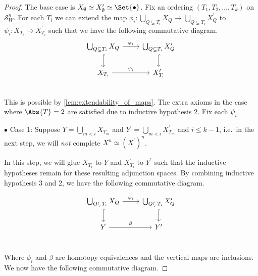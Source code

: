 \documentclass[class=article, crop=false]{standalone}
\begin{document}
\begin{proof}
    The base case is $X_\emptyset \simeq X^\prime_\emptyset \simeq \Set{\bullet}$.
    Fix an ordering $(T_1, T_2, \ldots , T_k)$ on $\mathcal{S}^n_W$.
    For each $T_i$ we can extend the map $\phi_i \colon \bigcup_{Q \subsetneq T_i} X_{Q} \to \bigcup_{Q \subsetneq T_i} X^\prime_{Q}$ to $\psi_i \colon X_{T_i} \to X^\prime_{T_i}$ such that we have the following commutative diagram.
    \vspace{0.2cm}
    \begin{equation*}
        \begin{tikzcd}
\bigcup_{Q \subsetneq T_i} X_{Q}  \ar[r, "\phi_i"]             &   \bigcup_{Q \subsetneq T_i} X^\prime_{Q}                                  \\
X_{T_i} \ar[r, "\psi_i" ] \ar[from = u, hookrightarrow]                                  &   X^\prime_{T_i}  \ar[from = u, hookrightarrow]      \\
        \end{tikzcd}
    \end{equation*}
    \vspace{-0.2cm}
    This is possible by \cref{lem:extendability_of_maps}. The extra axioms in the case where $\Abs{T}=2$ are satisfied due to inductive hypothesis 2. Fix each $\psi_i$.

    $\bullet$ Case 1: Suppose $Y = \bigcup_{m < i} X_{T_m}$ and $Y^\prime = \bigcup_{m < i} X^\prime_{T_m}$ and $i\leq k-1$, i.e.~in the next step, we will \emph{not} complete $X^n \simeq (X^\prime)^n$.

    In this step, we will glue $X_{T_{i}}$ to $Y$ and $X^\prime_{T_{i}}$ to $Y^\prime$ such that the inductive hypotheses remain for these resulting adjunction spaces.
    By combining inductive hypothesis 3 and 2, we have the following commutative diagram.

    \begin{equation*}
        \begin{tikzcd}
\bigcup_{Q \subsetneq T_i} X_{Q} \ar[r, "\phi_i" ] \ar[d, hookrightarrow]     &   \bigcup_{Q \subsetneq T_i} X^\prime_{Q}  \ar[d, hookrightarrow]       \\
Y  \ar[r, "\beta"]                                                                 &   Y^\prime                                                  \\
        \end{tikzcd}
        \label{eqn:commutative_Y_inductive_hyp}  
    \end{equation*}

    Where $\phi_i$ and $\beta$ are homotopy equivalences and the vertical maps are inclusions. We now have the following commutative diagram.


\end{proof}
\end{document}
